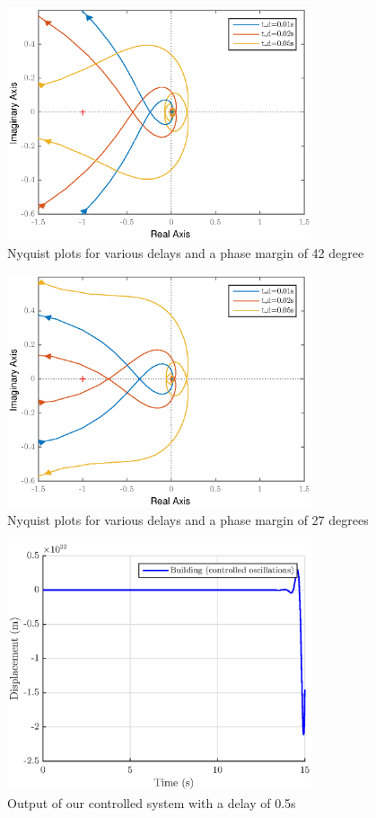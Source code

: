 \begin{figure}[H]
    \centering
    \includegraphics[width=0.8\textwidth]{resources/eps/4-Val/nyq_delay80.eps}
    \caption{Nyquist plots for various delays and a phase margin of 42 degree}
    \label{fig:nyquist-42}
\end{figure}
\begin{figure}[H]
    \centering
    \includegraphics[width=0.8\textwidth]{resources/eps/4-Val/nyq_delay65.eps}
    \caption{Nyquist plots for various delays and a phase margin of 27 degrees}
    \label{fig:nyquist-27}
\end{figure}
\begin{figure}[H]
    \centering
    \includegraphics[width=0.8\textwidth]{resources/eps/4-Val/toomuchdelay.eps}
    \caption{Output of our controlled system with a delay of 0.5s}
    \label{fig:toomuchdelay}
\end{figure}

